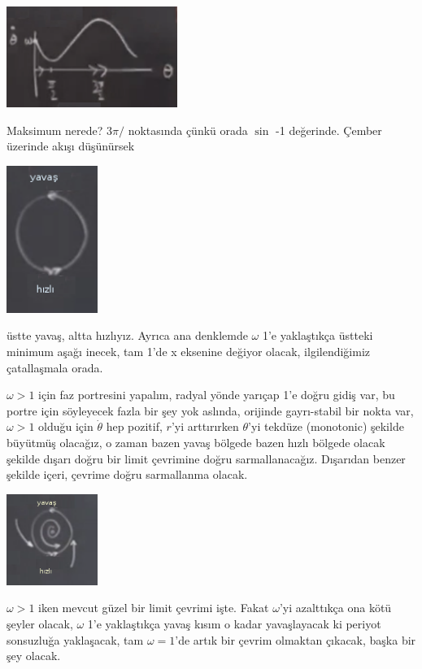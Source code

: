 \documentclass[12pt,fleqn]{article}\usepackage{../../common}
\begin{document}
\includegraphics[width=15em]{14_08.png}

Maksimum nerede? $3\pi/$ noktasında çünkü orada $\sin$ -1 değerinde. Çember
üzerinde akışı düşünürsek

\includegraphics[width=8em]{14_09.png}

üstte yavaş, altta hızlıyız. Ayrıca ana denklemde $\omega$ 1'e yaklaştıkça
üstteki minimum aşağı inecek, tam 1'de x eksenine değiyor olacak,
ilgilendiğimiz çatallaşmala orada.

$\omega > 1$ için faz portresini yapalım, radyal yönde yarıçap 1'e doğru
gidiş var, bu portre için söyleyecek fazla bir şey yok aslında, orijinde
gayrı-stabil bir nokta var, $\omega > 1$ olduğu için $\dot{\theta}$ hep
pozitif, $r$'yi arttırırken $\theta$'yi tekdüze (monotonic) şekilde
büyütmüş olacağız, o zaman bazen yavaş bölgede bazen hızlı bölgede olacak
şekilde dışarı doğru bir limit çevrimine doğru sarmallanacağız. Dışarıdan
benzer şekilde içeri, çevrime doğru sarmallanma olacak. 

\includegraphics[width=8em]{14_10.png}

$\omega > 1$ iken mevcut güzel bir limit çevrimi işte. Fakat $\omega$'yi
azalttıkça ona kötü şeyler olacak, $\omega$ 1'e yaklaştıkça yavaş kısım o
kadar yavaşlayacak ki periyot sonsuzluğa yaklaşacak, tam $\omega = 1$'de
artık bir çevrim olmaktan çıkacak, başka bir şey olacak. 
\end{document}

